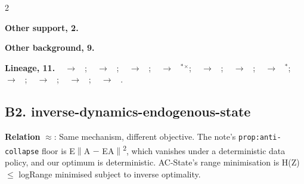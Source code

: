 \documentclass[10pt]{article}
\newcommand{\memb}[1]{\par\smallskip\textbf{#1}\quad}
\begin{document}
\begin{multicols}{2}
\memb{Other support, 2.} \citetext{\citealp{Yarats-reinforcement21}; \citealp{Lyle-understanding22}}

\memb{Other background, 9.} {\footnotesize \citetext{\citealp{Jonschkowski-learning15}; \citealp{Kurutach-learning18}; \citealp{Behzadian-fast19}; \citealp{Shu-predictive20}; \citealp{Nachum-provable21}; \citealp{Ye-mastering21}; \citealp{Lesort-state18}; \citealp{Xie-pretraining22}; \citealp{Echchahed-survey25}}}

\end{multicols}
\memb{Lineage, 11.} {\footnotesize \citeauthor{Li-towards06}~\citeyear{Li-towards06} $\to$ \citeauthor{Ni-bridging24}~\citeyear{Ni-bridging24}; \citeauthor{Gelada-deepmdp19}~\citeyear{Gelada-deepmdp19} $\to$ \citeauthor{Schwarzer-dataefficient21}~\citeyear{Schwarzer-dataefficient21}; \citeauthor{Schwarzer-dataefficient21}~\citeyear{Schwarzer-dataefficient21} $\to$ \citeauthor{Ye-mastering21}~\citeyear{Ye-mastering21}; \citeauthor{Subramanian-approximate20}~\citeyear{Subramanian-approximate20} $\to$ \citeauthor{Ni-bridging24}~\citeyear{Ni-bridging24}$^\ast$$^\times$; \citeauthor{Tian-understanding21}~\citeyear{Tian-understanding21} $\to$ \citeauthor{Tang-understanding23}~\citeyear{Tang-understanding23}; \citeauthor{Tang-understanding23}~\citeyear{Tang-understanding23} $\to$ \citeauthor{Ni-bridging24}~\citeyear{Ni-bridging24}; \citeauthor{Tang-understanding23}~\citeyear{Tang-understanding23} $\to$ \citeauthor{Yu-auxiliary25}~\citeyear{Yu-auxiliary25}$^\ast$; \citeauthor{Khetarpal-unifying24}~\citeyear{Khetarpal-unifying24} $\to$ \citeauthor{Voelcker-when24}~\citeyear{Voelcker-when24}; \citeauthor{Ni-bridging24}~\citeyear{Ni-bridging24} $\to$ \citeauthor{Khetarpal-unifying24}~\citeyear{Khetarpal-unifying24}; \citeauthor{Balestriero-lejepa25}~\citeyear{Balestriero-lejepa25} $\to$ \citeauthor{Maes-leworldmodel26}~\citeyear{Maes-leworldmodel26}; \citeauthor{Maes-leworldmodel26}~\citeyear{Maes-leworldmodel26} $\to$ \citeauthor{Boylan-gaussian26}~\citeyear{Boylan-gaussian26}.}

\subsection{B2. inverse-dynamics-endogenous-state}\label{node:S6-S6-B-inverse-dynamics-endogenous-state}
\textbf{Relation} $\approx$: Same mechanism, different objective. The note's \texttt{prop:anti-collapse} floor is E\ensuremath{\|}A \ensuremath{-} EA\ensuremath{\|}\textsuperscript{2}, which vanishes under a deterministic data policy, and our optimum is deterministic. AC-State's range minimisation is H(Z) \ensuremath{\leq} log\textbar{}Range\textbar{} minimised subject to inverse optimality.
\end{document}

